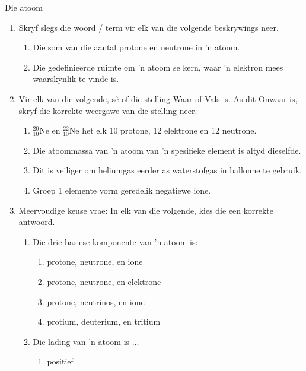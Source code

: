 \begin{eocexercises}{Die atoom}
            \nopagebreak
      \begin{enumerate}[noitemsep, label=\textbf{\arabic*}. ] 
            \item Skryf slegs die woord / term vir elk van die volgende beskrywings neer.
\begin{enumerate}[noitemsep, label=\textbf{\alph*}. ] 
            \item Die som van die aantal protone en neutrone in  'n atoom.
\item Die gedefinieerde ruimte om  'n atoom se kern, waar  'n elektron mees waarskynlik te vinde is.
\end{enumerate}
                \item Vir elk van die volgende, sê of die stelling Waar of Vals is. As dit Onwaar is, skryf die korrekte weergawe van die stelling neer.
\begin{enumerate}[noitemsep, label=\textbf{\alph*}. ] 
            \item $_{10}^{20}\text{Ne}$ en $_{10}^{22}\text{Ne}$ het elk 10 protone, 12 elektrone en 12 neutrone.
\item Die atoommassa van  'n atoom van  'n spesifieke element is altyd dieselfde.
\item Dit is veiliger om heliumgas eerder as waterstofgas in ballonne te gebruik.
\item Groep 1 elemente vorm geredelik negatiewe ione.
\end{enumerate}
                \item Meervoudige keuse vrae: In elk van die volgende, kies die een korrekte antwoord.
\begin{enumerate}[noitemsep, label=\textbf{\alph*}. ] 
            \item Die drie basiese komponente van  'n atoom is:
\begin{enumerate}[noitemsep, label=\textbf{\alph*}. ] 
            \item protone, neutrone, en ione
\item protone, neutrone, en elektrone
\item protone, neutrinos, en ione
\item protium, deuterium, en tritium
\end{enumerate}
                \item Die lading van  'n atoom is ...
\begin{enumerate}[noitemsep, label=\textbf{\alph*}. ] 
            \item positief

\end{enumerate}
\end{enumerate}
\end{enumerate}
\end{eocexercises}
